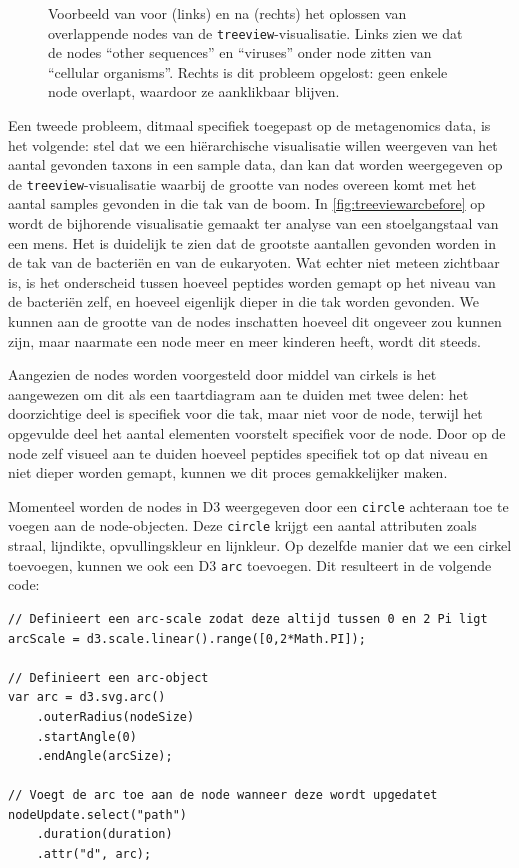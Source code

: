 \begin{figure}
\begin{subfigure}{0.42\textwidth}
    \label{fig:treeviewafter}
\end{subfigure}
\caption{Voorbeeld van voor (links) en na (rechts) het oplossen van overlappende
nodes van de \texttt{treeview}-visualisatie. Links zien we dat de nodes ``other
sequences'' en ``viruses'' onder node zitten van ``cellular organisms''. Rechts
is dit probleem opgelost: geen enkele node overlapt, waardoor ze aanklikbaar
blijven.} \label{fig:treeviewbeforeandafter}
\end{figure}

Een tweede probleem, ditmaal specifiek toegepast op de metagenomics data, is het
volgende: stel dat we een hiërarchische visualisatie willen weergeven van het
aantal gevonden taxons in een sample data, dan kan dat worden weergegeven op de
\texttt{treeview}-visualisatie waarbij de grootte van nodes overeen komt met het
aantal samples gevonden in die tak van de boom. In
\cref{fig:treeviewarcbefore} op  wordt de
bijhorende visualisatie gemaakt ter analyse van een stoelgangstaal van een mens.
Het is duidelijk te zien dat de grootste aantallen gevonden worden in de tak van
de bacteriën en van de eukaryoten. Wat echter niet meteen zichtbaar is, is het
onderscheid tussen hoeveel peptides worden gemapt op het niveau van de bacteriën
zelf, en hoeveel eigenlijk dieper in die tak worden gevonden. We kunnen aan de
grootte van de nodes inschatten hoeveel dit ongeveer zou kunnen zijn, maar
naarmate een node meer en meer kinderen heeft, wordt dit steeds.

Aangezien de nodes worden voorgesteld door middel van cirkels is het aangewezen
om dit als een taartdiagram aan te duiden met twee delen: het doorzichtige deel
is specifiek voor die tak, maar niet voor de node, terwijl het opgevulde deel
het aantal elementen voorstelt specifiek voor de node.
Door op de node zelf visueel aan te duiden hoeveel peptides specifiek tot op dat
niveau en niet dieper worden gemapt, kunnen we dit proces gemakkelijker maken.

Momenteel worden de nodes in D3 weergegeven door een \texttt{circle} achteraan 
toe te voegen aan de node-objecten. Deze \texttt{circle} krijgt een aantal 
attributen zoals straal, lijndikte, opvullingskleur en lijnkleur. Op dezelfde 
manier dat we een cirkel toevoegen, kunnen we ook een D3 \texttt{arc} 
toevoegen\cite{d3arc:online}. Dit resulteert in de volgende code:

\begin{lstlisting}
// Definieert een arc-scale zodat deze altijd tussen 0 en 2 Pi ligt
arcScale = d3.scale.linear().range([0,2*Math.PI]);

// Definieert een arc-object
var arc = d3.svg.arc()
    .outerRadius(nodeSize)
    .startAngle(0)
    .endAngle(arcSize);

// Voegt de arc toe aan de node wanneer deze wordt upgedatet
nodeUpdate.select("path")
    .duration(duration)
    .attr("d", arc);
\end{lstlisting}

